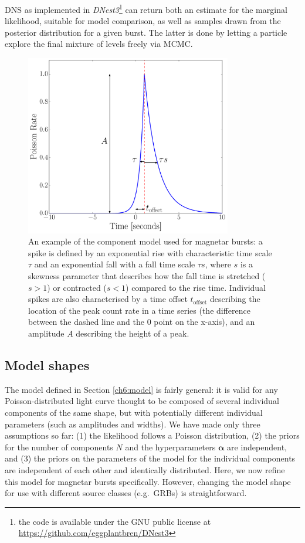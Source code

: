 \documentclass[12pt]{emulateapj}
\begin{document}
DNS as implemented in {\it DNest3}\footnote{the code is available under the GNU public license at \url{https://github.com/eggplantbren/DNest3}} can return both an estimate for the marginal likelihood,
suitable for model comparison, as well as samples drawn from the posterior distribution for a given burst. The latter is done by letting a particle explore
the final mixture of levels freely via MCMC\@. 
\begin{figure}[h]
\begin{center}
\includegraphics[width=9cm]{f2.pdf}%
\caption{An example of the component model used for magnetar bursts: a spike is defined by an exponential rise with characteristic
time scale $\tau$ and an exponential fall with a fall time scale $\tau s$, where $s$ is a skewness parameter that describes how the fall
time is stretched ($s > 1$) or contracted ($s < 1$) compared to the rise time. Individual spikes are also characterised by a time offset
$t_{\mathrm{offset}}$ describing the location of the peak count rate in a time series (the difference between the dashed line and the 0 point
on the x-axis), and an amplitude $A$ describing the height of a peak.}
\label{fig:word_example}
\end{center}
\end{figure}



\subsection{Model shapes}
\label{ch6:wordmodel}

The model defined in Section \ref{ch6:model} is fairly general: it is valid for any Poisson-distributed light curve thought to be composed of several individual components of
the same shape, but with potentially different individual parameters (such as amplitudes and widths). 
We have made only three assumptions so far: (1) the likelihood follows a Poisson distribution, (2) the priors for the number of components $N$ and the hyperparameters $\bm{\alpha}$ are independent,
and (3) the priors on the parameters of the model for the individual components are independent of each other and identically distributed. 
Here, we now refine this model for magnetar bursts specifically. However, changing the model shape for use with different source classes (e.g.\ GRBs) is straightforward.
\end{document}
